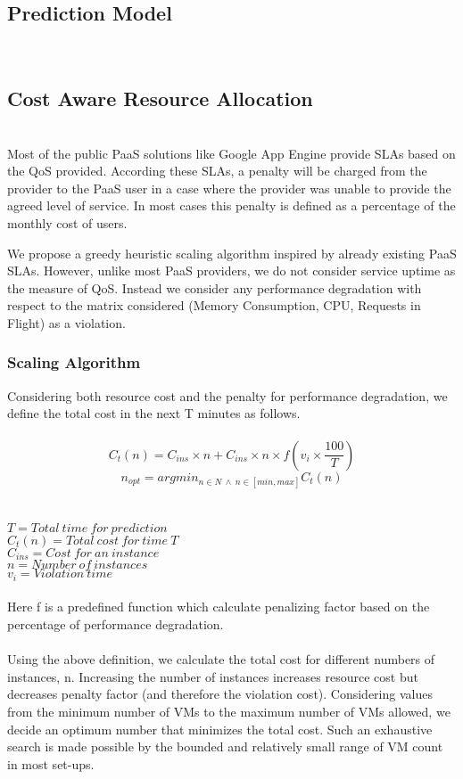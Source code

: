 \subsection{Prediction Model}\\

\subsection{Cost Aware Resource Allocation}\\
Most of the public PaaS solutions like Google App Engine provide SLAs based on the QoS provided. According these SLAs, a penalty will be charged from the provider to the PaaS user in a case where the provider was unable to provide the agreed level of service. In most cases this penalty is defined as a percentage of the monthly cost of users.

We propose a greedy heuristic scaling algorithm inspired by already existing PaaS SLAs. However, unlike most PaaS providers, we do not consider service uptime as the measure of QoS. Instead we consider any performance degradation with respect to the matrix considered (Memory Consumption, CPU, Requests in Flight) as a violation.

\subsubsection{Scaling Algorithm}
Considering both resource cost and the penalty for performance degradation, we define the total cost in the next T minutes as follows.\\
\\
\textbf{$$ C_t(n) = C_{ins} \times n  +  C_{ins} \times n \times f(v_i \times \frac{100}{T}) $$}
\textbf{$$n_{opt} = argmin_{n \in N \ \land \ n \in [min, max]}C_t(n)$$} \\
\\
$T       = Total\ time\ for\ prediction $ \\
$C_t(n)  = Total\ cost\ for\ time\ T $ \\
$C_{ins} = Cost\ for\ an\ instance$   \\
$n       = Number\ of\ instances $  \\
$v_i     = Violation\ time $ \\
\\
Here f is a predefined function which calculate penalizing factor based on the percentage of performance degradation.\\
\\
Using the above definition, we calculate the total cost for different numbers of instances, n. Increasing the number of instances increases resource cost but decreases penalty factor (and therefore the violation cost). Considering values from the minimum number of VMs to the maximum number of VMs allowed, we decide an optimum number that minimizes the total cost. Such an exhaustive search is made possible by the bounded and relatively small range of VM count in most set-ups.
